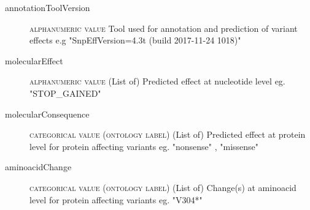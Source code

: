 \documentclass[a4paper, 10pt]{article}        %
\begin{document}
\begin{description}
	\item[annotationToolVersion] {\textsc{alphanumeric value}} Tool used for annotation and prediction of variant effects e.g "SnpEffVersion=4.3t (build 2017-11-24 1018)"
	\item[molecularEffect] {\textsc{alphanumeric value}} (List of) Predicted effect at nucleotide level eg. "STOP\_GAINED"
	\item[molecularConsequence]  {\textsc{categorical value (ontology label)}} (List of) Predicted effect at protein level for protein affecting variants eg. "nonsense" , "missense"
	\item[aminoacidChange]  {\textsc{categorical value (ontology label)}} (List of) Change(s) at aminoacid level for protein affecting variants eg. "V304*"
	
 \end{description}



\end{document}
